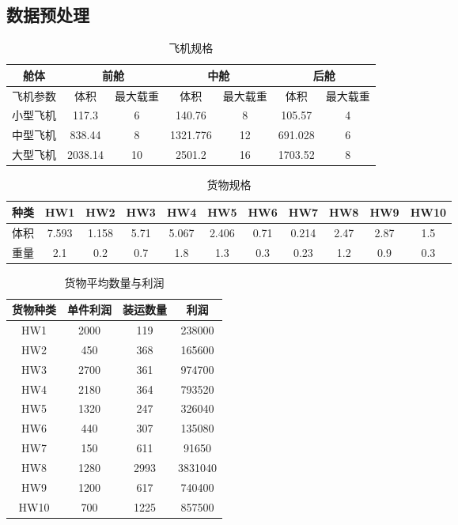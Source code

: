 \documentclass{article}
\begin{document}
	\subsection{数据预处理}
	\begin{table}[!h]
		\centering
		\caption{飞机规格}
		\begin{tabular}{|c|c|c|c|c|c|c|}
			\hline
			舱体   & \multicolumn{2}{c|}{前舱} & \multicolumn{2}{c|}{中舱} & \multicolumn{2}{c|}{后舱} \\ \hline
			飞机参数 & 体积           & 最大载重     & 体积           & 最大载重     & 体积           & 最大载重     \\ \hline
			小型飞机 & 117.3        & 6        & 140.76       & 8        & 105.57       & 4        \\ \hline
			中型飞机 & 838.44       & 8        & 1321.776     & 12       & 691.028      & 6        \\ \hline
			大型飞机 & 2038.14      & 10       & 2501.2       & 16       & 1703.52      & 8        \\ \hline
		\end{tabular}
	\end{table}
	\begin{table}[!h]
		\centering
		\caption{货物规格}
		\begin{tabular}{|c|c|c|c|c|c|c|c|c|c|c|}
			\hline
			种类 & HW1   & HW2   & HW3  & HW4   & HW5   & HW6  & HW7   & HW8  & HW9  & HW10 \\ \hline
			体积 & 7.593 & 1.158 & 5.71 & 5.067 & 2.406 & 0.71 & 0.214 & 2.47 & 2.87 & 1.5  \\ \hline
			重量 & 2.1   & 0.2   & 0.7  & 1.8   & 1.3   & 0.3  & 0.23  & 1.2  & 0.9  & 0.3  \\ \hline
		\end{tabular}
	\end{table}
	\begin{table}[!h]
		\centering
		\caption{货物平均数量与利润}
		\begin{tabular}{|c|c|c|c|}
			\hline
			货物种类 & 单件利润 & 装运数量 & 利润      \\ \hline
			HW1  & 2000 & 119  & 238000  \\ \hline
			HW2  & 450  & 368  & 165600  \\ \hline
			HW3  & 2700 & 361  & 974700  \\ \hline
			HW4  & 2180 & 364  & 793520  \\ \hline
			HW5  & 1320 & 247  & 326040  \\ \hline
			HW6  & 440  & 307  & 135080  \\ \hline
			HW7  & 150  & 611  & 91650   \\ \hline
			HW8  & 1280 & 2993 & 3831040 \\ \hline
			HW9  & 1200 & 617  & 740400  \\ \hline
			HW10 & 700  & 1225 & 857500  \\ \hline
		\end{tabular}
	\end{table}
\end{document}
